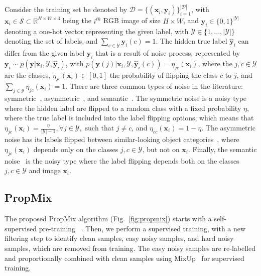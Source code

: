 \documentclass{bmvc2k}
\begin{document}
Consider the training set be denoted by $\mathcal{D}=\{(\mathbf{x}_i, \mathbf{y}_i)\}_{i=1}^{|\mathcal{D}|}$, with  $\mathbf{x}_i \in \mathcal{S} \subset \mathbb{R}^{H \times W \times 3}$ being the $i^{th}$ RGB image of size $H \times W$, and $\mathbf{y}_i \in \{0,1\}^{|\mathcal{Y}|}$ denoting a one-hot vector representing the given label, with $\mathcal{Y} \in \{1,...,|\mathcal{Y}|\}$ denoting the set of labels, and $\sum_{c \in \mathcal{Y}} \mathbf{y}_i(c)=1$. The hidden true label $\hat{\mathbf{y}}_i$ can differ from the given label  $\mathbf{y}_i$ that is a result of noise process, represented by $\mathbf{y}_i \sim p(\mathbf{y} | \mathbf{x}_i,\mathcal{Y},\hat{\mathbf{y}}_i)$, with $p(\mathbf{y}(j) | \mathbf{x}_i,\mathcal{Y},\hat{\mathbf{y}}_i(c))=\eta_{jc}(\mathbf{x}_i)$,
where the $j,c\in\mathcal{Y}$ are the classes, $\eta_{jc}(\mathbf{x}_i) \in [0,1]$ the probability of flipping the class $c$ to $j$, and $\sum_{j \in \mathcal{Y}}\eta_{jc}(\mathbf{x}_i)=1$. There are three common types of noise in the literature:  symmetric~\citep{kim2019nlnl}, asymmetric~\citep{patrini2017making}, and semantic~\citep{rog}.
The symmetric noise is a noisy type where the hidden label are flipped to a 
random class
with a fixed probability $\eta$, where the true label is included into the label flipping options, which means that $\eta_{jc}(\mathbf{x}_i)=\frac{\eta}{|\mathcal{Y}|-1}, \forall j \in \mathcal{Y}, \text{ such that } j \neq c$, and $\eta_{cc}(\mathbf{x}_i)=1-\eta$. 
The asymmetric noise has its labels flipped between similar-looking object categories~\citep{patrini2017making}, where $\eta_{jc}(\mathbf{x}_i)$ depends only on the classes $j,c\in\mathcal{Y}$, but not on $\mathbf{x}_i$. Finally, the semantic noise~\citep{rog} is the noisy type where the label flipping depends both on the classes $j,c\in\mathcal{Y}$ and image $\mathbf{x}_i$. 

\vspace{-.1in}
\subsection{PropMix}
\label{sec:propmix}


The proposed PropMix algorithm (Fig.~\ref{fig:propmix}) starts with a self-supervised pre-training ~\citep{SimCLR,MoCo,MoCoV2,SCAN}.  Then, we perform a supervised training, with a new filtering step to identify clean samples, easy noisy samples, and hard noisy samples, which are removed from training. The easy noisy samples are re-labelled and proportionally combined with clean samples using MixUp~\citep{mixup} for supervised training. 
\end{document}
